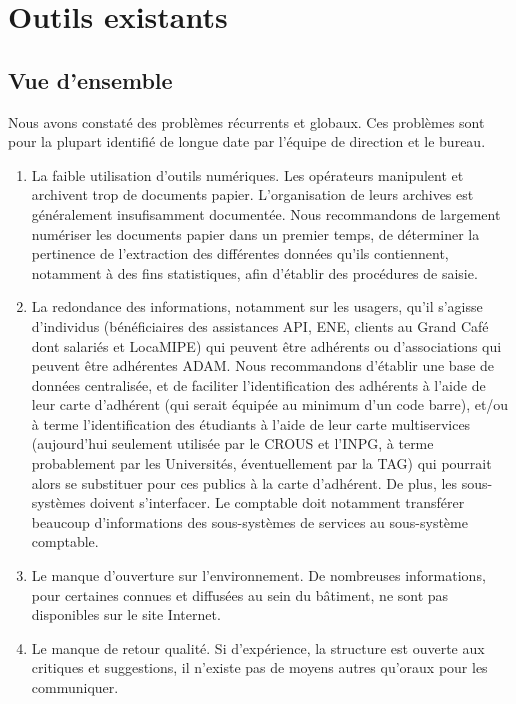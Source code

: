 \section{Outils existants}
\subsection{Vue d'ensemble}

Nous avons constaté des problèmes récurrents et globaux. Ces problèmes sont pour
la plupart identifié de longue date par l'équipe de direction et le bureau.

\begin{enumerate}
\item La faible utilisation d'outils numériques. Les opérateurs manipulent et archivent
      trop de documents papier.
      L'organisation de leurs archives est généralement insufisamment documentée.
      Nous recommandons de largement numériser les documents papier dans un premier temps,
      de déterminer la pertinence de l'extraction des différentes données qu'ils contiennent,
      notamment à des fins statistiques, afin d'établir des procédures de saisie.
\item La redondance des informations, notamment sur les usagers, qu'il s'agisse d'individus
      (bénéficiaires des assistances API, ENE, clients au Grand Café dont salariés et LocaMIPE)
      qui peuvent être adhérents ou d'associations qui peuvent être adhérentes ADAM.
      Nous recommandons d'établir une base de données centralisée, et de faciliter l'identification
      des adhérents à l'aide de leur carte d'adhérent (qui serait équipée au minimum d'un code barre),
      et/ou à terme l'identification des étudiants à l'aide de leur carte multiservices
      (aujourd'hui seulement utilisée par le CROUS et l'INPG, à terme probablement
      par les Universités, éventuellement par la TAG) qui pourrait alors se substituer
      pour ces publics à la carte d'adhérent.
      De plus, les sous-systèmes doivent s'interfacer. Le comptable doit notamment transférer
      beaucoup d'informations des sous-systèmes de services au sous-système comptable.
\item Le manque d'ouverture sur l'environnement. De nombreuses informations, pour certaines
      connues et diffusées au sein du bâtiment, ne sont pas disponibles sur le site Internet.
\item Le manque de retour qualité. Si d'expérience, la structure est ouverte aux critiques
      et suggestions, il n'existe pas de moyens autres qu'oraux pour les communiquer.

\end{enumerate}
